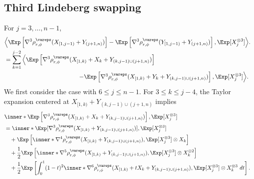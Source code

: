 \documentclass[aos]{imsart}
\begin{document}
\begin{appendix}
\subsection{Third Lindeberg swapping} \label{sec:third_lindeberg_swapping}

For $j = 3, \dots, n-1$,
\begin{equation*}
\begin{aligned}
    & \Big\langle 
        \Exp\left[ \nabla^3 \rho_{r,\phi}^\vareps(X_{[1,j-1)} + Y_{(j+1,n)}) \right] 
    - \Exp\left[ \nabla^3  \rho_{r,\phi}^\vareps(Y_{[1,j-1)} + Y_{(j+1,n)}) \right], \Exp[ X_j^{\otimes 3} ]\Big\rangle. \\
    & = \sum_{k=1}^{j-2} \Big\langle
        \Exp\left[ \nabla^3 \rho_{r,\phi}^\vareps(X_{[1,k)} + X_k + Y_{(k,j-1) \cup (j+1,n)}) \right] \\ 
    & \omit{\hfill $- \Exp\left[ \nabla^3   \rho_{r,\phi}^\vareps(X_{[1,k)} + Y_k + Y_{(k,j-1) \cup (j+1,n)}) \right], 
        \Exp[ X_j^{\otimes 3} ]
    \Big\rangle.$} \\
\end{aligned}
\end{equation*}
We first consider the case with $6 \leq j \leq n-1$.
For $3 \leq k \leq j-4$, the Taylor expansion centered at $X_{[1,k)} + Y_{(k,j-1) \cup (j+1,n)}$ implies
\begin{equation*}
\begin{aligned}
    & \inner*{
        \Exp\left[ \nabla^3 \rho_{r,\phi}^\vareps(X_{[1,k)} + X_k + Y_{(k,j-1) \cup (j+1,n)}) \right],
        \Exp[X_j^{\otimes 3}]
    } \\
    & = \inner*{
        \Exp[ \nabla^3 \rho_{r,\phi}^\vareps(X_{[1,k)} + Y_{(k,j-1) \cup (j+1,n)}) ],
        \Exp[X_j^{\otimes 3}] 
    } \\
    & \quad + \Exp\left[ \inner*{
        \nabla^4 \rho_{r,\phi}^\vareps(X_{[1,k)} + Y_{(k,j-1) \cup (j+1,n)}),
        \Exp[X_j^{\otimes 3}] \otimes X_k
    } \right] \\
    & \quad + \frac{1}{2} \Exp\left[ \inner*{
        \nabla^5 \rho_{r,\phi}^\vareps(X_{[1,k)} + Y_{(k,j-1) \cup (j+1,n)}),
        \Exp[X_j^{\otimes 3}] \otimes X_k^{\otimes 2}
    } \right] \\
    & \quad + \frac{1}{2} \Exp\left[ \int_0^1 (1-t)^2 \inner*{
        \nabla^6 \rho_{r,\phi}^\vareps(X_{[1,k)} + t X_k + Y_{(k,j-1) \cup (j+1,n)}) ,
        \Exp[X_j^{\otimes 3}] \otimes X_k^{\otimes 3}
    } ~dt \right].
\end{aligned}
\end{equation*}

\end{appendix}
\end{document}
